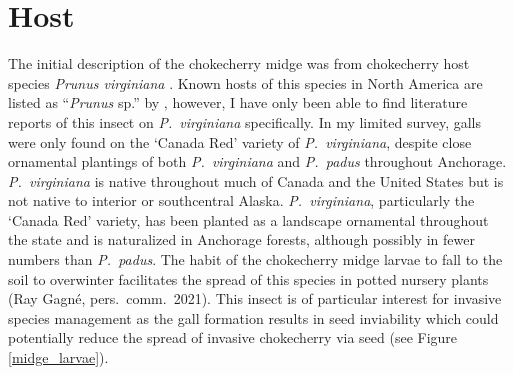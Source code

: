 \section{Host}
 The initial description of the chokecherry midge was from chokecherry host species \textit{Prunus virginiana} \citep{Felt1906}. Known hosts of this species in North America are listed as ``\textit{Prunus} sp.'' by \citet{GagneJaschhof2021}, however, I have only been able to find literature reports of this insect on \textit{P.\ virginiana} specifically. In my limited survey, galls were only found on the `Canada Red' variety of \textit{P.\ virginiana}, despite close ornamental plantings of both \textit{P.\ virginiana} and \textit{P.\ padus} throughout Anchorage. \textit{P.\ virginiana} is native throughout much of Canada and the United States but is not native to interior or southcentral Alaska. \textit{P.\ virginiana}, particularly the `Canada Red' variety, has been planted as a landscape ornamental throughout the state and is naturalized in Anchorage forests, although possibly in fewer numbers than \textit{P.\ padus}. The habit of the chokecherry midge larvae to fall to the soil to overwinter facilitates the spread of this species in potted nursery plants (Ray Gagn\'{e}, pers.\ comm.\ 2021). This insect is of particular interest for invasive species management as the gall formation results in seed inviability which could potentially reduce the spread of invasive chokecherry via seed (see Figure \ref{midge_larvae}).

